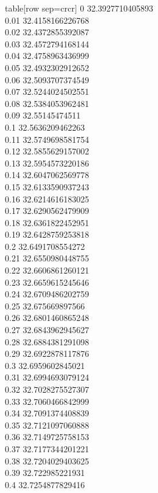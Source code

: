   table[row sep=crcr]{%
0	32.3927710405893\\
0.01	32.4158166226768\\
0.02	32.4372855392087\\
0.03	32.4572794168144\\
0.04	32.4758963436999\\
0.05	32.4932302912652\\
0.06	32.5093707374549\\
0.07	32.5244024502551\\
0.08	32.5384053962481\\
0.09	32.55145474511\\
0.1	32.5636209462263\\
0.11	32.5749698581754\\
0.12	32.5855629157002\\
0.13	32.5954573220186\\
0.14	32.6047062569778\\
0.15	32.6133590937243\\
0.16	32.6214616183025\\
0.17	32.6290562479909\\
0.18	32.6361822452951\\
0.19	32.6428759253818\\
0.2	32.6491708554272\\
0.21	32.6550980448755\\
0.22	32.6606861260121\\
0.23	32.6659615245646\\
0.24	32.6709486202759\\
0.25	32.675669897566\\
0.26	32.6801460865248\\
0.27	32.6843962945627\\
0.28	32.6884381291098\\
0.29	32.6922878117876\\
0.3	32.6959602845021\\
0.31	32.6994693079124\\
0.32	32.7028275527307\\
0.33	32.7060466842999\\
0.34	32.7091374408839\\
0.35	32.7121097060888\\
0.36	32.7149725758153\\
0.37	32.7177344201221\\
0.38	32.7204029403625\\
0.39	32.722985221931\\
0.4	32.7254877829416\\
}
